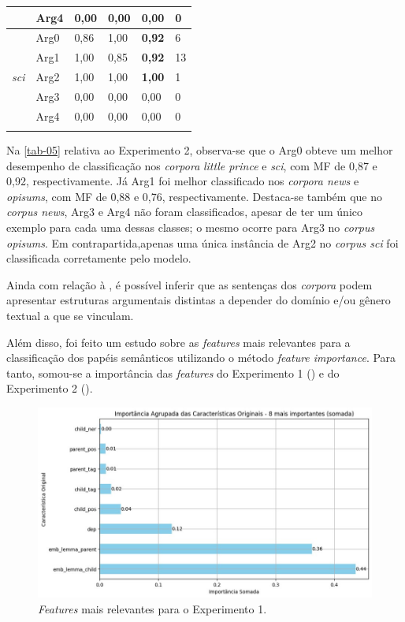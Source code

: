 \begin{table}[htpb]
\begin{threeparttable}
\begin{tabular}{*{6}{l}}
        & Arg4 & 0,00 & 0,00 & 0,00 & 0 \\
      \midrule
      \multirow{5}{*}{\emph{sci}} 
        & Arg0 & 0,86 & 1,00 & \textbf{0,92} & 6 \\
        & Arg1 & 1,00 & 0,85 & \textbf{0,92} & 13 \\
        & Arg2 & 1,00 & 1,00 & \textbf{1,00} & 1 \\
        & Arg3 & 0,00 & 0,00 & 0,00 & 0 \\
        & Arg4 & 0,00 & 0,00 & 0,00 & 0 \\
      \arrayrulecolor{black}
      \bottomrule
    \end{tabular}
  \end{threeparttable}
\end{table}


Na \cref{tab-05} relativa ao Experimento 2, observa-se que o Arg0 obteve um
melhor desempenho de classificação nos \emph{corpora} \emph{little
prince} e \emph{sci}, com MF de 0,87 e 0,92, respectivamente. Já Arg1
foi melhor classificado nos \emph{corpora news} e \emph{opisums}, com MF
de 0,88 e 0,76, respectivamente. Destaca-se também que no \emph{corpus
news}, Arg3 e Arg4 não foram classificados, apesar de ter um único
exemplo para cada uma dessas classes; o mesmo ocorre para Arg3 no
\emph{corpus opisums}. Em contrapartida,apenas uma única instância de
Arg2 no \emph{corpus sci} foi classificada corretamente pelo modelo.

Ainda com relação à , é possível inferir que as sentenças dos
\emph{corpora} podem apresentar estruturas argumentais distintas a
depender do domínio e/ou gênero textual a que se vinculam.

Além disso, foi feito um estudo sobre as \emph{features} mais relevantes
para a classificação dos papéis semânticos utilizando o método
\emph{feature importance}. Para tanto, somou-se a importância das
\emph{features} do Experimento 1 () e do Experimento 2 ().

\begin{figure}[h]
  \centering
  \begin{minipage}{.75\textwidth}
  \includegraphics[width=\textwidth]{figure06.jpg}
  \caption{\emph{Features} mais relevantes para o Experimento 1.}
  \label{fig-06}
  \end{minipage}
\end{figure}

